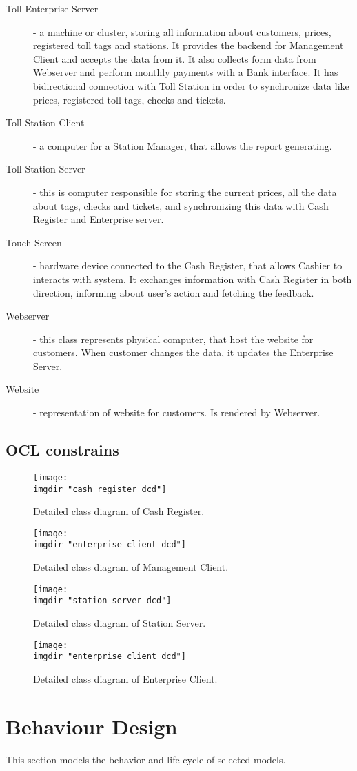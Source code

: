 \begin{description}
\item[Toll Enterprise Server] - a machine or cluster, storing all information about customers, prices, registered toll tags and stations. It provides the backend for Management Client and accepts the data from it. It also collects form data from Webserver and perform monthly payments with a Bank interface. It has bidirectional connection with Toll Station in order to synchronize data like prices, registered toll tags, checks and tickets. 
\item [Toll Station Client] - a computer for a Station Manager, that allows the report generating.
\item [Toll Station Server] - this is computer responsible for storing the current prices, all the data about tags, checks and tickets, and synchronizing this data with Cash Register and Enterprise server.
\item [Touch Screen] - hardware device connected to the Cash Register, that allows Cashier to interacts with system. It exchanges information with Cash Register in both direction, informing about user's action and fetching the feedback. 
\item[Webserver] - this class represents physical computer, that host the website for customers. When customer changes the data, it updates the Enterprise Server.
\item[Website] - representation of website for customers. Is rendered by Webserver.
\end{description}

\subsection{OCL constrains}

\begin{figure}
  \centering
  \texttt{[image: \\imgdir "cash\_register\_dcd"]}
  \caption{Detailed class diagram of Cash Register.}
  \label{fig:dcd_cr}
  \texttt{[image: \\imgdir "enterprise\_client\_dcd"]}
  \caption{Detailed class diagram of Management Client.}
  \label{fig:dcd_mc}
  \texttt{[image: \\imgdir "station\_server\_dcd"]}
  \caption{Detailed class diagram of Station Server.}
  \label{fig:dcd_ss}
  \texttt{[image: \\imgdir "enterprise\_client\_dcd"]}
  \caption{Detailed class diagram of Enterprise Client.}
  \label{fig:dcd_ec}
\end{figure}

\section{Behaviour Design}
This section models the behavior and life-cycle of selected models.

